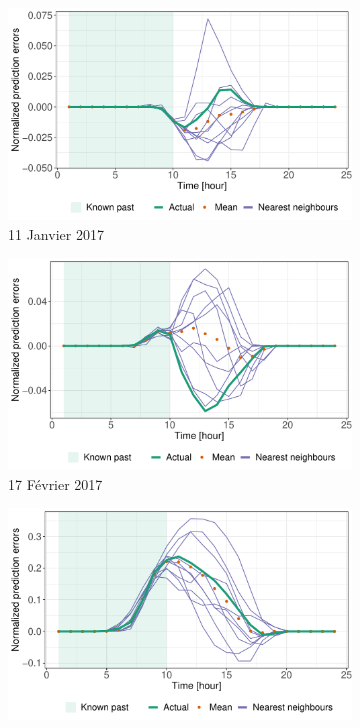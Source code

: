 \documentclass[12pt, french]{report}
\begin{document}
\begin{figure}[htb] 
	\begin{subfigure}[b]{0.5\linewidth}
		\centering
		\includegraphics[width=1\linewidth]{Images/PV/KNN/NN_intraday_testdata_11.pdf} 
		\caption{11 Janvier 2017} 
		\label{fig:KNN_Intraday_scenarios_110117} 
	\end{subfigure}%
	\begin{subfigure}[b]{0.5\linewidth}
		\centering
		\includegraphics[width=1\linewidth]{Images/PV/KNN/NN_intraday_testdata_48.pdf} 
		\caption{17 Février 2017} 
		\label{fig:KNN_Intraday_scenarios_170217}
	\end{subfigure}
	\centering
	\begin{subfigure}[b]{0.5\linewidth}
		\centering
		\includegraphics[width=1\linewidth]{Images/PV/KNN/NN_intraday_testdata_99.pdf} 

\end{subfigure}
\end{figure}
\end{document}
